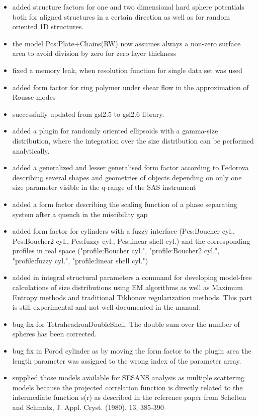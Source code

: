 \begin{description}
\begin{itemize}
    \item added structure factors for one and two dimensional hard sphere potentials both for aligned structures in a certain direction as well as for random oriented 1D structures.
    \item the model Pcs:Plate+Chains(RW) now assumes always a non-zero surface area to avoid division by zero for zero layer thickness
    \item fixed a memory leak, when resolution function for single data set was used
    \item added form factor for ring polymer under shear flow in the approximation of Rousse modes
    \item successfully updated from gsl2.5 to gsl2.6 library.
    \item added a plugin for randomly oriented ellipsoids with a gamma-size distribution, where the integration over the size distribution can be performed analytically.
    \item added a generalized and lesser generalised form factor according to Fedorova describing several shapes and geometries of objects depending on only one size parameter visible in the q-range of the SAS instrument
    \item added a form factor describing the scaling function of a phase separating system after a quench in the miscibility gap
    \item added form factor for cylinders with a fuzzy interface (Pcs:Boucher cyl., Pcs:Boucher2 cyl., Pcs:fuzzy cyl., Pcs:linear shell cyl.) and the corresponding profiles in real space ("profile:Boucher cyl.", "profile:Boucher2 cyl.", "profile:fuzzy cyl.", "profile:linear shell cyl.")
    \item added in integral structural parameters a command for developing model-free calculations of size distributions using EM algorithms as well as Maximum Entropy methods and traditional Tikhonov regularization methods. This part is still experimental and not well documented in the manual.
    \item bug fix for TetraheadronDoubleShell. The double sum over the number of spheres has been corrected.
    \item bug fix in Porod cylinder as by moving the form factor to the plugin area the length parameter was assigned to the wrong index of the parameter array.
    \item supplied those models available for SESANS analysis as multiple scattering models because the projected correlation function is directly related to the intermediate function s(r) as described in the reference paper from Schelten and Schmatz, J. Appl. Cryst. (1980). 13, 385-390

\end{itemize}
\end{description}

